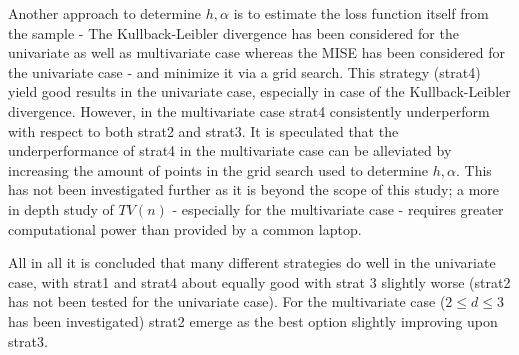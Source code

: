 \documentclass[
twoside,
openright,
titlepage,
numbers=noenddot,
headinclude,%
footinclude=true,
dottedtoc, %
ngerman,
american, %
pagesize=pdftex,
]{book}
\begin{document}
	Another approach to determine $h,\alpha$ is to estimate the loss function itself from the sample - The Kullback-Leibler divergence has been considered for the univariate as well as multivariate case whereas the MISE has been considered for the univariate case - and minimize it via a grid search. This strategy (strat4) yield good results in the univariate case, especially in case of the Kullback-Leibler divergence. However, in the multivariate case strat4 consistently underperform  with respect to both strat2 and strat3. It is speculated that the underperformance of strat4 in the multivariate case can be alleviated by increasing the amount of points in the grid search used to determine $h,\alpha$. This has not been investigated further as it is beyond the scope of this study; a more in depth study of $TV(n)$ - especially for the multivariate case - requires greater computational power than provided by a common laptop.\newline\newline
	
	\noindent All in all it is concluded that many different strategies do well in the univariate case, with strat1 and strat4 about equally good with strat 3 slightly worse (strat2 has not been tested for the univariate case). For the multivariate case ($2\leq d\leq 3$ has been investigated) strat2 emerge as the best option slightly improving upon strat3. 

	
\end{document}
